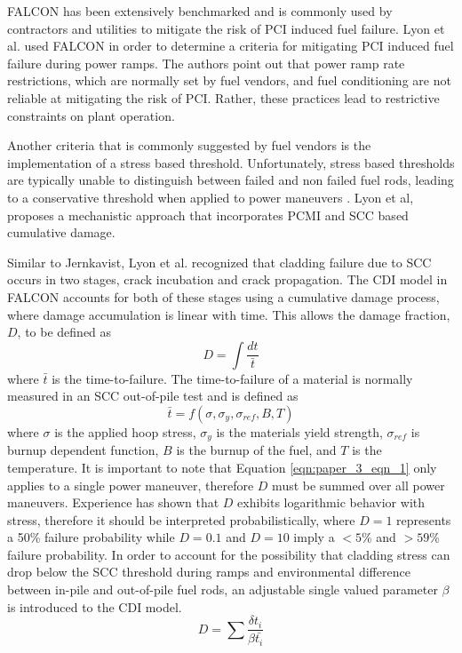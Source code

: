\documentclass[edeposit,fullpage,11pt]{uiucthesis2009}
\begin{document}
FALCON has been extensively benchmarked and is commonly used by contractors and utilities to mitigate the risk of \gls{PCI} induced fuel failure.
Lyon et al. \cite{lyon_pci_2009} used FALCON in order to determine a criteria for mitigating \gls{PCI} induced fuel failure during power ramps.
The authors point out that power ramp rate restrictions, which are normally set by fuel vendors, and fuel conditioning are not reliable at mitigating the risk of \gls{PCI}. 
Rather, these practices lead to restrictive constraints on plant operation.

Another criteria that is commonly suggested by fuel vendors is the implementation of a stress based threshold.
Unfortunately, stress based thresholds are typically unable to distinguish between failed and non failed fuel rods, leading to a conservative threshold when applied to power maneuvers \cite{lyon_pci_2009}.
 Lyon et al, proposes a mechanistic approach that incorporates \gls{PCMI} and \gls{SCC} based cumulative damage.

Similar to Jernkavist,  Lyon et al. recognized that cladding failure due to \gls{SCC} occurs in two stages, crack incubation and crack propagation.
The \gls{CDI} model in FALCON accounts for both of these stages using a cumulative damage process, where damage accumulation is linear with time.
This allows the damage fraction, $D$, to be defined as 
\begin{equation}\label{eqn:paper_3_eqn_1}
D = \int \frac{dt}{\bar{t}}
\end{equation}
where $\bar{t}$ is the time-to-failure.
The time-to-failure of a material is normally measured in an \gls{SCC} out-of-pile test and is defined as
\begin{equation}
\bar{t} = f(\sigma,\sigma_y,\sigma_{ref},B,T)
\end{equation}
where $\sigma$ is the applied hoop stress, $\sigma_y$ is the materials yield strength, $\sigma_{ref}$ is burnup dependent function, $B$ is the burnup of the fuel, and $T$ is the temperature.
It is important to note that Equation \ref{eqn:paper_3_eqn_1} only applies to a single power maneuver, therefore $D$ must be summed over all power maneuvers. 
Experience has shown that $D$ exhibits logarithmic behavior with stress, therefore it should be interpreted probabilistically, where $D=1$ represents a 50\% failure probability while $D=0.1$ and $D=10$ imply a $<5$\% and $>59$\% failure probability.
In order to account for the possibility that cladding stress can drop below the \gls{SCC} threshold during ramps and environmental difference between in-pile and out-of-pile fuel rods, an adjustable single valued parameter $\beta$ is introduced to the \gls{CDI} model. 
\begin{equation}
D = \sum \frac{\delta t_i}{\beta \bar{t_i}}
\end{equation}
\end{document}
